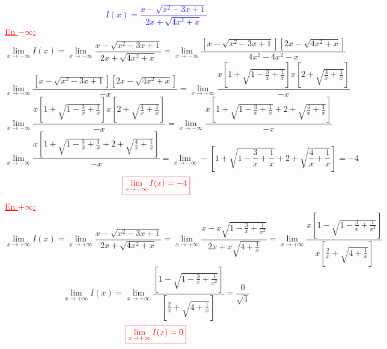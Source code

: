 \documentclass{article}
\begin{document}
\textcolor{blue}{\[I(x)=\frac{x-\sqrt{x^{2}-3x+1}}{2x+\sqrt{4x^{2}+x}}\]}
\textcolor{red}{\underline{En $-\infty$:}}
\[\lim_{x \to -\infty}I(x)=\lim_{x \to -\infty}\frac{x-\sqrt{x^{2}-3x+1}}{2x+\sqrt{4x^{2}+x}}=\lim_{x \to -\infty}\frac{\left[ x-\sqrt{x^{2}-3x+1}\right] \left[ 2x-\sqrt{4x^{2}+x} \right] }{4x^{2}-4x^{2}-x}\]
\[\lim_{x \to -\infty}\frac{\left[ x-\sqrt{x^{2}-3x+1}\right] \left[ 2x-\sqrt{4x^{2}+x} \right] }{-x}=\lim_{x \to -\infty}\frac{x\left[ 1+\sqrt{1-\frac{3}{x}+\frac{1}{x}}\right] x\left[ 2+\sqrt{\frac{4}{x}+\frac{1}{x}} \right] }{-x}\]
\[\lim_{x \to -\infty}\frac{x\left[ 1+\sqrt{1-\frac{3}{x}+\frac{1}{x}}\right] x\left[ 2+\sqrt{\frac{4}{x}+\frac{1}{x}} \right] }{-x}=\lim_{x \to -\infty}\frac{x\left[ 1+\sqrt{1-\frac{3}{x}+\frac{1}{x}} + 2+\sqrt{\frac{4}{x}+\frac{1}{x}} \right] }{-x}\]
\[\lim_{x \to -\infty}\frac{x\left[ 1+\sqrt{1-\frac{3}{x}+\frac{1}{x}} + 2+\sqrt{\frac{4}{x}+\frac{1}{x}} \right] }{-x}=\lim_{x \to -\infty}-\left[ 1+\sqrt{1-\frac{3}{x}+\frac{1}{x}} + 2+\sqrt{\frac{4}{x}+\frac{1}{x}} \right]=-4\]
\[\textcolor{red}{\boxed{\lim_{x \to -\infty}I(x)=-4}}\]
\textcolor{red}{\underline{En $+\infty$:}}
\[\lim_{x \to +\infty}I(x)=\lim_{x \to +\infty}\frac{x-\sqrt{x^{2}-3x+1}}{2x+\sqrt{4x^{2}+x}}=\lim_{x \to +\infty}\frac{x-x\sqrt{1-\frac{3}{x}+\frac{1}{x^{2}}}}{2x+x\sqrt{4+\frac{1}{x}}}=\lim_{x \to +\infty}\frac{x\left[1-\sqrt{1-\frac{3}{x}+\frac{1}{x^{2}}}\right]}{x\left[ \frac{2}{x}+\sqrt{4+\frac{1}{x}}\right]}\]
\[\lim_{x \to +\infty}I(x)=\lim_{x \to +\infty}\frac{\left[1-\sqrt{1-\frac{3}{x}+\frac{1}{x^{2}}}\right]}{\left[ \frac{2}{x}+\sqrt{4+\frac{1}{x}}\right]}=\frac{0}{\sqrt{4}}\]
\[\textcolor{red}{\boxed{\lim_{x \to +\infty}I(x)=0}}\]
\end{document}
